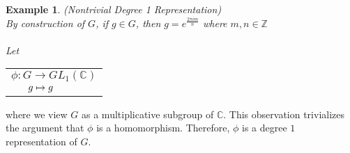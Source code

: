 \documentclass[10pt]{ucthesis}
\newtheorem{example}[definition]{Example}
\begin{document}
\begin{example}
	(Nontrivial Degree 1 Representation) \\
	By construction of $G$, if $g\in G$, then $g = e^{\frac{2\pi im }{n}}$ where $m,n\in \mathbb{Z}$	
	\renewcommand{\arraystretch}{0.7}\\\\
	Let   \begin{tabular}{l}$\phi:G\rightarrow GL_1(\mathbb{C})$\\
		$\hspace{6mm}g\mapsto g$
		\end{tabular}
\end{example}
\noindent where we view $G$ as a multiplicative subgroup of $\mathbb{C}$. This observation trivializes the argument that $\phi$ is a homomorphism. Therefore, $\phi$ is a degree $1$ representation of $G$.		
\end{document}
